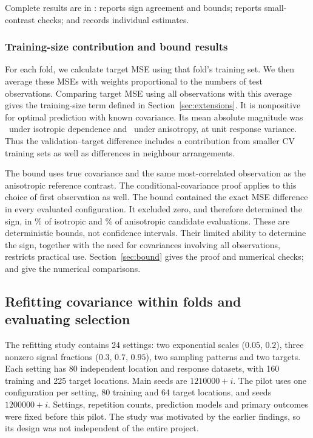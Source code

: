 \documentclass[11pt,a4paper]{article}
\begin{document}
Complete results are in :  reports sign agreement and bounds;  reports small-contrast checks; and  records individual estimates.

\subsubsection{Training-size contribution and bound results}
\label{sec:training-bound-results}
For each fold, we calculate target MSE using that fold's training set. We then average these MSEs with weights proportional to the numbers of test observations. Comparing target MSE using all observations with this average gives the training-size term defined in Section~\ref{sec:extensions}. It is nonpositive for optimal prediction with known covariance. Its mean absolute magnitude was \SizeIso\ under isotropic dependence and \SizeAniso\ under anisotropy, at unit response variance. Thus the validation--target difference includes a contribution from smaller CV training sets as well as differences in neighbour arrangements.

The bound uses true covariance and the same most-correlated observation as the anisotropic reference contrast. The conditional-covariance proof applies to this choice of first observation as well. The bound contained the exact MSE difference in every evaluated configuration. It excluded zero, and therefore determined the sign, in \CertIso\% of isotropic and \CertAniso\% of anisotropic candidate evaluations. These are deterministic bounds, not confidence intervals. Their limited ability to determine the sign, together with the need for covariances involving all observations, restricts practical use. Section~\ref{sec:bound} gives the proof and numerical checks;  and  give the numerical comparisons.

\subsection{Refitting covariance within folds and evaluating selection}
\label{sec:refitting}
The refitting study contains 24 settings: two exponential scales ($0.05$, $0.2$), three nonzero signal fractions ($0.3$, $0.7$, $0.95$), two sampling patterns and two targets. Each setting has 80 independent location and response datasets, with 160 training and 225 target locations. Main seeds are $1210000+i$. The pilot uses one configuration per setting, 80 training and 64 target locations, and seeds $1200000+i$. Settings, repetition counts, prediction models and primary outcomes were fixed before this pilot. The study was motivated by the earlier findings, so its design was not independent of the entire project.
\end{document}
